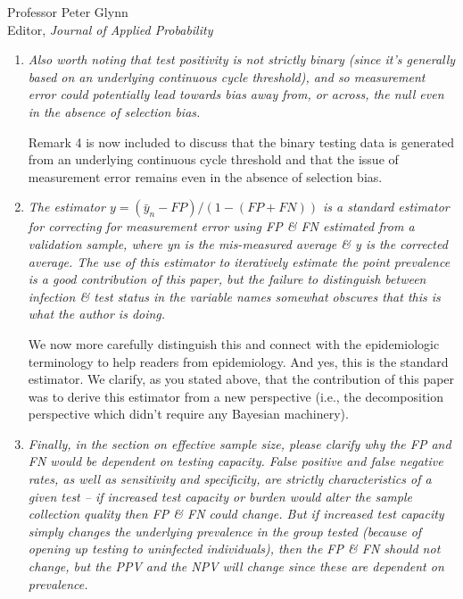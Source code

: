 \documentclass[11pt]{letter} %
\begin{document}
\begin{letter}{Professor
	Peter Glynn\\
	Editor, {\em Journal of Applied Probability}}
\begin{enumerate}
\begin{enumerate}
	The adjustment is exactly related to the Bayes rule PPV/NPV relationship with FP, FN, and $\bar Y$.
	\vspace{5mm}
	\item {\it Also worth noting that test positivity is not strictly binary (since it’s generally based on an underlying continuous cycle threshold), and so measurement error could potentially lead towards bias away from, or across, the null even in the absence of selection bias.}
	\vspace{5mm}

	Remark 4 is now included to discuss that the binary testing data is generated from an underlying continuous cycle threshold and that the issue of measurement error remains even in the absence of selection bias.
	\vspace{5mm}

	\item {\it The estimator $y = (\bar y_n-FP) /(1-(FP+FN))$ is a standard estimator for correcting for measurement error using FP \& FN estimated from a validation sample, where yn is the mis-measured average \& y is the corrected average. The use of this estimator to iteratively estimate the point prevalence is a good contribution of this paper, but the failure to distinguish between infection \& test status in the variable names somewhat obscures that this is what the author is doing.}
	\vspace{5mm}

	We now more carefully distinguish this and connect with the epidemiologic terminology to help readers from epidemiology.  And yes, this is the standard estimator.  We clarify, as you stated above, that the contribution of this paper was to derive this estimator from a new perspective (i.e., the decomposition perspective which didn't require any Bayesian machinery).
	\vspace{5mm}

	\item {\it Finally, in the section on effective sample size, please clarify why the FP and FN would be dependent on testing capacity. False positive and false negative rates, as well as sensitivity and specificity, are strictly characteristics of a given test – if increased test capacity or burden would alter the sample collection quality then FP \& FN could change. But if increased test capacity simply changes the underlying prevalence in the group tested (because of opening up testing to uninfected individuals), then the FP \& FN should not change, but the PPV and the NPV will change since these are dependent on prevalence.}
	\vspace{5mm}


\end{enumerate}
\end{enumerate}
\end{letter}
\end{document}
